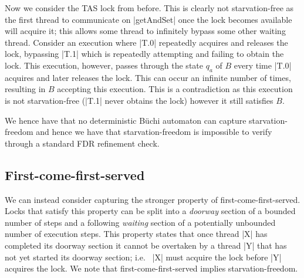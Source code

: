 
Now we consider the TAS lock from before. This is clearly not starvation-free as the first thread to communicate on |getAndSet| once the lock becomes available will acquire it; this allows some thread to infinitely bypass some other waiting thread. Consider an execution where |T.0| repeatedly acquires and releases the lock, bypassing |T.1| which is repeatedly attempting and failing to obtain the lock. This execution, however, passes through the state $q_{a}$ of $B$ every time |T.0| acquires and later releases the lock. This can occur an infinite number of times, resulting in $B$ accepting this execution. This is a contradiction as this execution is not starvation-free (|T.1| never obtains the lock) however it still satisfies $B$.



We hence have that no deterministic B{\"u}chi automaton can capture starvation-freedom and hence we have that starvation-freedom is impossible to verify through a standard FDR refinement check.

\subsection{First-come-first-served}

We can instead consider capturing the stronger property of first-come-first-served. Locks that satisfy this property can be split into a \emph{doorway} section of a bounded number of steps and a following \emph{waiting} section of a potentially unbounded number of execution steps. This property states that once thread |X| has completed its doorway section it cannot be overtaken by a thread |Y| that has not yet started its doorway section; i.e.~ |X| must acquire the lock before |Y| acquires the lock. We note that first-come-first-served implies starvation-freedom.

